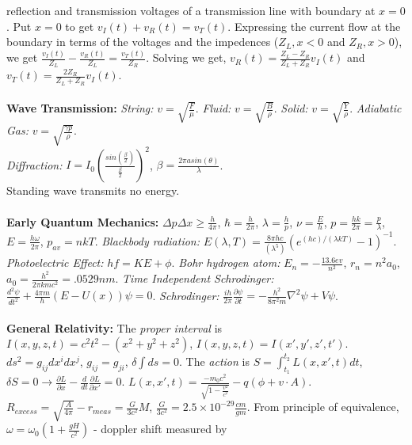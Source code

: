 reflection and transmission voltages of a transmission line with boundary
at $x=0$.  Put $x=0$ to get 
$v_I(t)+v_R(t)=v_T(t)$. Expressing the current
flow at the boundary in terms of the voltages and the impedences ($Z_L, x<0$ and
$Z_R, x>0$), we get
${\frac {v_I(t)} {Z_L}}-{\frac {v_R(t)} {Z_L}}={\frac {v_T(t)} {Z_R}}$.
Solving we get, $v_R(t)= {\frac {Z_L-Z_R}{Z_L+Z_R}}v_I(t)$ and
$v_T(t)= {\frac {2Z_R}{Z_L+Z_R}}v_I(t)$.
\\
\\
{\bf Wave Transmission:}
\emph{String:} $v= {\sqrt {\frac F \mu}}$.
\emph{Fluid:} $v= {\sqrt {\frac B \rho}}$.
\emph{Solid:} $v= {\sqrt {\frac Y \rho}}$.
\emph{Adiabatic Gas:} $v= {\sqrt {\frac {\gamma p } \rho}}$.\\
\emph{Diffraction:} $I = I_0 ({\frac {sin({\frac {\beta} {2}})} {\frac {\beta}{2}}})^2$,
$\beta = {\frac {2 \pi a sin( \theta )} {\lambda}}$.
\\
Standing wave transmits no energy.
\\
\\
{\bf Early Quantum Mechanics:} $\Delta p \Delta x \geq {\frac {h} {4 \pi}}$,
$\hbar = {\frac {h}{2 \pi}}$,
$\lambda = {\frac {h}{p}}$,
$\nu = {\frac {E}{h}}$,
$p = {\frac { h k }{ 2 \pi }} = {\frac {p}{\lambda}}$,
$E = {\frac {h \omega}{2 \pi}}$,
$p_{av} = n k T$. \emph{Blackbody radiation:}
$E(\lambda , T ) = {\frac {8 \pi h c} {(\lambda^{5})}} (e^{{(h c)} /
{(\lambda k T )}}- 1)^{-1}$.  
\emph{Photoelectric Effect:} $hf= KE+ \phi$.
\emph{Bohr hydrogen atom:} $E_n = -{\frac {13.6 ev} {n^2}}$, $r_n=n^2a_0$,
$a_0= {\frac {h^2} {2 \pi k m c^2}}= .0529 nm$.
\emph{Time Independent Schrodinger:}
${\frac {d^2 \psi} {dt^2}}+{\frac {4 \pi m} {h}}(E-U(x)) \psi = 0$.
\emph{Schrodinger:}
${\frac {ih} {2 \pi}} {\frac {\partial \psi} {\partial t}} =
-{\frac {h^2} {8 \pi^2 m}} \nabla^2 \psi + V \psi$.
\\
\\
{\bf General Relativity:}
The \emph{proper interval} is $I(x,y,z,t)= c^2 t^2 - (x^2 + y^2 +z^2 )$, 
$I(x,y,z,t)=I(x',y',z',t')$.
$ds^{2}= g_{ij} dx^{i} dx^{j}$, $g_{ij} = g_{ji}$, $\delta \int {ds} = 0$.
The \emph{action} is $S= \int_{t_1}^{t_2} L(x, x', t) dt$, $\delta S=0 \rightarrow 
{\frac {\partial L} {\partial x}}- {\frac d {dt}} {\frac {\partial L} {\partial x'}}=0$.
$L(x,x',t)= {\frac {-m_0 c^2} {\sqrt {1-{\frac {v^2} {c^2}}}}} - q(\phi + v \cdot A)$.  
$R_{excess}= {\sqrt {\frac {A} {4 \pi}}} - r_{meas}= {\frac {G} {3 c^2}}M$,
${\frac {G} {3 c^2}}= 2.5 \times 10^{-29} {\frac {cm} {gm}}$.  From principle of
equivalence, $\omega= \omega_0 (1+ {\frac {gH} {c^2}})$ - doppler shift measured by 
